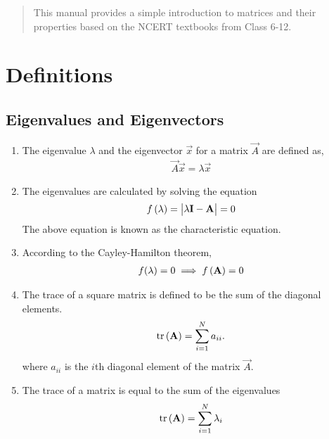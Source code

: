 \documentclass[journal,12pt,twocolumn]{IEEEtran}
\renewcommand\thesection{\arabic{section}}
\renewcommand\thesubsection{\thesection.\arabic{subsection}}
\begin{document}



%

\begin{abstract}
This manual provides a simple introduction to matrices and their properties based on the NCERT textbooks from Class 6-12.  
\end{abstract}

\section{Definitions}
\subsection{Eigenvalues and Eigenvectors}
\renewcommand{\theequation}{\theenumi}
\begin{enumerate}[label=\thesubsection.\arabic*.,ref=\thesubsection.\theenumi]
\item The eigenvalue $\lambda$ and the eigenvector $\vec{x}$  for a matrix $\vec{A}$ are defined as, 
\begin{align}
  \vec{A} \vec{x} = \lambda \vec{x}
\end{align}
\item The eigenvalues are calculated by solving the
equation
\begin{align}
  \label{eq:chareq}
f\left(\lambda\right) = \begin{vmatrix}\lambda \mathbf{I}- \mathbf{A} \end{vmatrix} =0
\end{align}
The above equation is known as the characteristic equation.
\item According to the Cayley-Hamilton theorem,
\begin{align}
	\label{eq:cayley}
  f(\lambda) = 0 \implies f\left(\mathbf{A}\right) = 0
\end{align}
\item The trace of a square  matrix is defined to be the sum of the diagonal elements.
\begin{align}
	\label{eq:trace}
	\text{tr}\left(\mathbf{A}\right)=\sum_{i=1}^{N}a_{ii}.
\end{align}
	where $a_{ii}$ is the $i$th diagonal element of the matrix $\vec{A}$. 	
\item The trace of a matrix is equal to the sum of the eigenvalues
\begin{align}
	\label{eq:trace_eig}
	\text{tr}\left(\mathbf{A}\right)=\sum_{i=1}^{N}\lambda_i
\end{align}


\end{enumerate}
\end{document}
